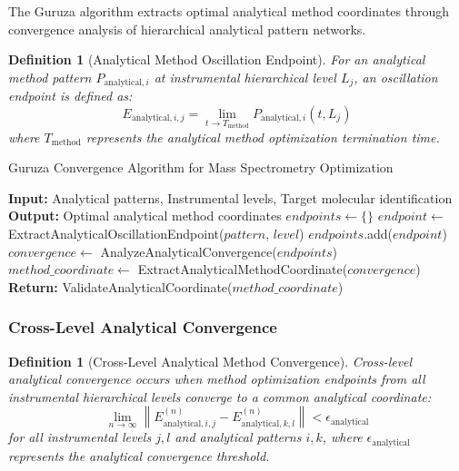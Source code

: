 \documentclass[11pt,a4paper]{article}
\newtheorem{definition}[theorem]{Definition}
\theoremstyle{remark}
\begin{document}
The Guruza algorithm extracts optimal analytical method coordinates through convergence analysis of hierarchical analytical pattern networks.

\begin{definition}[Analytical Method Oscillation Endpoint]
For an analytical method pattern $P_{\text{analytical},i}$ at instrumental hierarchical level $L_j$, an oscillation endpoint is defined as:
\begin{equation}
E_{\text{analytical},i,j} = \lim_{t \to T_{\text{method}}} P_{\text{analytical},i}(t, L_j)
\end{equation}
where $T_{\text{method}}$ represents the analytical method optimization termination time.
\end{definition}

\begin{algorithm}[H]
\caption{Guruza Convergence Algorithm for Mass Spectrometry Optimization}
\begin{algorithmic}[1]
\State \textbf{Input:} Analytical patterns, Instrumental levels, Target molecular identification
\State \textbf{Output:} Optimal analytical method coordinates
\State $endpoints \gets \{\}$
\State $endpoint \gets$ ExtractAnalyticalOscillationEndpoint($pattern$, $level$)
\State $endpoints$.add($endpoint$)
\EndFor
\EndFor
\State $convergence \gets$ AnalyzeAnalyticalConvergence($endpoints$)
\State $method\_coordinate \gets$ ExtractAnalyticalMethodCoordinate($convergence$)
\State \textbf{Return:} ValidateAnalyticalCoordinate($method\_coordinate$)
\EndProcedure
\end{algorithmic}
\end{algorithm}

\subsubsection{Cross-Level Analytical Convergence}

\begin{definition}[Cross-Level Analytical Method Convergence]
Cross-level analytical convergence occurs when method optimization endpoints from all instrumental hierarchical levels converge to a common analytical coordinate:
\begin{equation}
\lim_{n \to \infty} \left\| E_{\text{analytical},i,j}^{(n)} - E_{\text{analytical},k,l}^{(n)} \right\| < \epsilon_{\text{analytical}}
\end{equation}
for all instrumental levels $j, l$ and analytical patterns $i, k$, where $\epsilon_{\text{analytical}}$ represents the analytical convergence threshold.
\end{definition}
\end{document}
